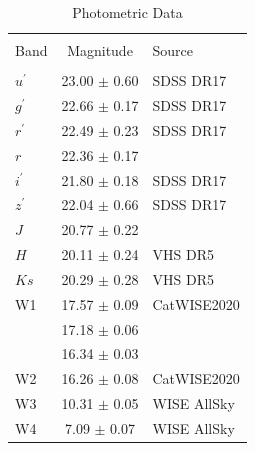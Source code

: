 \begin{table}
    \caption{\label{tab:phot} Photometric Data}
    \begin{tabular}{lcl}
        \hline \hline\\
        Band & Magnitude & Source\\
        \hline\\
        $u^{\prime}$  &           23.00 $\pm$ 0.60 & SDSS DR17\\
        $g^{\prime}$  &           22.66 $\pm$ 0.17 & SDSS DR17\\
        $r^{\prime}$  &           22.49 $\pm$ 0.23 & SDSS DR17\\
        $r$           &           22.36 $\pm$ 0.17 & \citet{assef20}\\
        $i^{\prime}$  &           21.80 $\pm$ 0.18 & SDSS DR17\\
        $z^{\prime}$  &           22.04 $\pm$ 0.66 & SDSS DR17\\
        $J$           &           20.77 $\pm$ 0.22 & \citet{assef15}\\
        $H$           &           20.11 $\pm$ 0.24 & VHS DR5\\
        $Ks$          &           20.29 $\pm$ 0.28 & VHS DR5\\
        W1            &           17.57 $\pm$ 0.09 & CatWISE2020\\
        [3.6]         &           17.18 $\pm$ 0.06 & \citet{griffith12}\\
        [4.5]         &           16.34 $\pm$ 0.03 & \citet{griffith12}\\
        W2            &           16.26 $\pm$ 0.08 & CatWISE2020\\
        W3            &           10.31 $\pm$ 0.05 & WISE AllSky\\
        W4            & \phantom{0}7.09 $\pm$ 0.07 & WISE AllSky\\
        \hline
    \end{tabular}
\end{table}